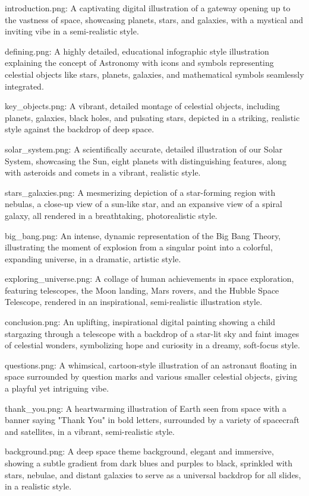introduction.png: A captivating digital illustration of a gateway opening up to the vastness of space, showcasing planets, stars, and galaxies, with a mystical and inviting vibe in a semi-realistic style. 

defining.png: A highly detailed, educational infographic style illustration explaining the concept of Astronomy with icons and symbols representing celestial objects like stars, planets, galaxies, and mathematical symbols seamlessly integrated.

key_objects.png: A vibrant, detailed montage of celestial objects, including planets, galaxies, black holes, and pulsating stars, depicted in a striking, realistic style against the backdrop of deep space.

solar_system.png: A scientifically accurate, detailed illustration of our Solar System, showcasing the Sun, eight planets with distinguishing features, along with asteroids and comets in a vibrant, realistic style.

stars_galaxies.png: A mesmerizing depiction of a star-forming region with nebulas, a close-up view of a sun-like star, and an expansive view of a spiral galaxy, all rendered in a breathtaking, photorealistic style.

big_bang.png: An intense, dynamic representation of the Big Bang Theory, illustrating the moment of explosion from a singular point into a colorful, expanding universe, in a dramatic, artistic style.

exploring_universe.png: A collage of human achievements in space exploration, featuring telescopes, the Moon landing, Mars rovers, and the Hubble Space Telescope, rendered in an inspirational, semi-realistic illustration style.

conclusion.png: An uplifting, inspirational digital painting showing a child stargazing through a telescope with a backdrop of a star-lit sky and faint images of celestial wonders, symbolizing hope and curiosity in a dreamy, soft-focus style.

questions.png: A whimsical, cartoon-style illustration of an astronaut floating in space surrounded by question marks and various smaller celestial objects, giving a playful yet intriguing vibe.

thank_you.png: A heartwarming illustration of Earth seen from space with a banner saying "Thank You" in bold letters, surrounded by a variety of spacecraft and satellites, in a vibrant, semi-realistic style.

background.png: A deep space theme background, elegant and immersive, showing a subtle gradient from dark blues and purples to black, sprinkled with stars, nebulae, and distant galaxies to serve as a universal backdrop for all slides, in a realistic style.